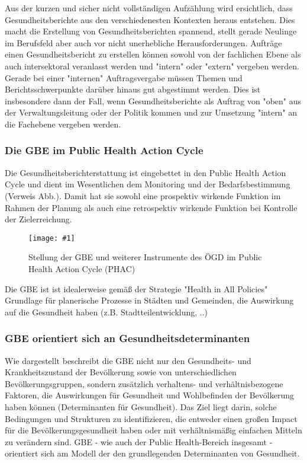 \documentclass{article}
\newlength{\imgwidth}
\newcommand\scaledgraphics[2]{%
                
\settowidth{\imgwidth}{\texttt{[image: \#1]}}%
                
\setlength{\imgwidth}{\minof{\imgwidth}{#2\textwidth}}%
                
\texttt{[image: \#1]}%
                
}
\begin{document}
Aus der kurzen und sicher nicht vollständigen Aufzählung wird ersichtlich, dass Gesundheitsberichte aus den verschiedenesten Kontexten heraus entstehen. Dies macht die Erstellung von Gesundheitsberichten spannend, stellt gerade Neulinge im Berufsfeld aber auch vor nicht unerhebliche Herausforderungen. Aufträge einen Gesundheitsbericht zu erstellen können sowohl von der fachlichen Ebene als auch intersektoral veranlasst werden und "intern" oder "extern" vergeben werden. Gerade bei einer "internen" Auftragsvergabe müssen Themen und Berichtsschwerpunkte darüber hinaus gut abgestimmt werden. Dies ist insbesondere dann der Fall, wenn Gesundheitsberichte als Auftrag von "oben" aus der Verwaltungsleitung oder der Politik kommen und zur Umsetzung "intern" an die Fachebene vergeben werden. 


\subsubsection{\textbf{Die GBE im }\textbf{Public Health Action Cycle}}\label{H1901688}



Die Gesundheitsberichterstattung ist eingebettet in den Public Health Action Cycle und dient im Wesentlichen dem Monitoring und der Bedarfsbestimmung (Verweis Abb.). Damit hat sie sowohl eine prospektiv wirkende Funktion im Rahmen der Planung als auch eine retrospektiv  wirkende Funktion bei Kontrolle der Zielerreichung.

\begin{figure}
\scaledgraphics{e44f6caa-bb9c-4108-ba23-5f2688aea1cb.jpg}{1}
\caption*{Stellung der GBE und weiterer Instrumente des ÖGD im Public Health Action Cycle (PHAC)}\label{F52895671}
\end{figure}


Die GBE ist ist idealerweise gemäß der Strategie "Health in All Policies" Grundlage für planerische Prozesse in Städten und Gemeinden, die Auswirkung auf die Gesundheit haben (z.B. Stadtteilentwicklung, ..) 


\subsubsection{\textbf{G}\textbf{BE orientiert sich an Gesundheitsdeterminanten}}\label{H2786889}



Wie dargestellt beschreibt die GBE nicht nur den Gesundheits- und Krankheitszustand der Bevölkerung sowie von unterschiedlichen Bevölkerungsgruppen, sondern zusätzlich verhaltens- und verhältnisbezogene Faktoren, die Auswirkungen für Gesundheit und Wohlbefinden der Bevölkerung haben können (Determinanten für Gesundheit). Das Ziel liegt darin, solche Bedingungen und Strukturen zu identifizieren, die entweder einen großen Impact für die Bevölkerungsgesundheit haben oder mit verhältnismäßig einfachen Mitteln zu verändern sind. GBE - wie auch der Public Health-Bereich insgesamt - orientiert sich am Modell der  den grundlegenden Determinanten von Gesundheit. 
\end{document}

